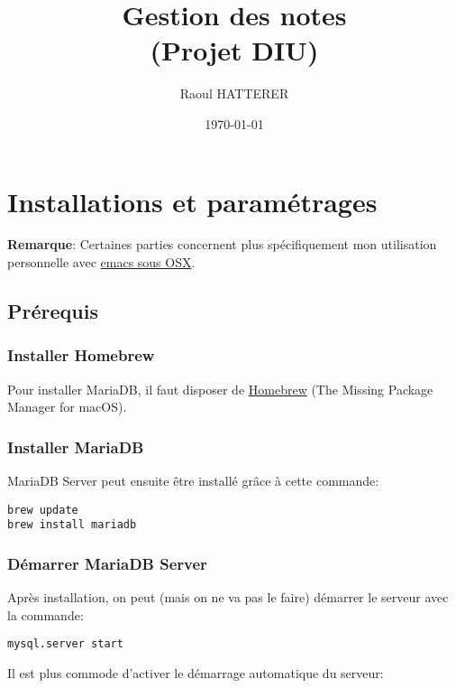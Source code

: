 \documentclass[11pt]{article}
\author{Raoul HATTERER}
\date{\today}
\title{Gestion des notes\\\medskip
\large (Projet DIU)}
\begin{document}
\maketitle
\setcounter{tocdepth}{2}
\tableofcontents

\newpage


\section{Installations et paramétrages}
\label{sec:org6cf1539}
\textbf{Remarque}: Certaines parties concernent plus spécifiquement mon utilisation personnelle avec \href{https://emacsformacosx.com}{emacs sous OSX}.
\subsection{Prérequis}
\label{sec:org2367d20}
\subsubsection{Installer Homebrew}
\label{sec:org125cf76}

Pour installer MariaDB, il faut disposer de \href{https://brew.sh/index\_fr}{Homebrew} (The Missing Package Manager for macOS).

\subsubsection{Installer MariaDB}
\label{sec:orgdcf676c}

MariaDB Server peut ensuite être installé grâce à cette commande:

\begin{verbatim}
brew update
brew install mariadb
\end{verbatim}

\subsubsection{Démarrer MariaDB Server}
\label{sec:org0c67830}
Après installation, on peut (mais on ne va pas le faire) démarrer le serveur avec la commande:
\begin{verbatim}
mysql.server start
\end{verbatim}

Il est plus commode d'activer le démarrage automatique du serveur:
\end{document}
